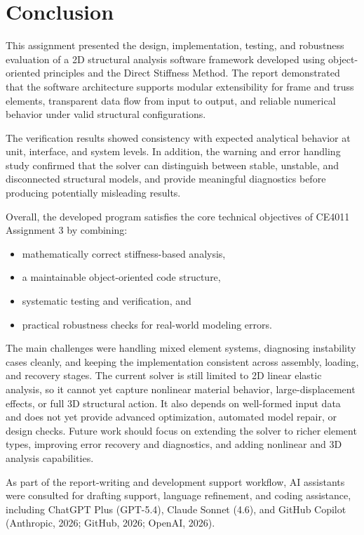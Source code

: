 \chapter{Conclusion}

This assignment presented the design, implementation, testing, and robustness evaluation of a 2D structural analysis software framework developed using object-oriented principles and the Direct Stiffness Method. The report demonstrated that the software architecture supports modular extensibility for frame and truss elements, transparent data flow from input to output, and reliable numerical behavior under valid structural configurations.

The verification results showed consistency with expected analytical behavior at unit, interface, and system levels. In addition, the warning and error handling study confirmed that the solver can distinguish between stable, unstable, and disconnected structural models, and provide meaningful diagnostics before producing potentially misleading results.

Overall, the developed program satisfies the core technical objectives of CE4011 Assignment 3 by combining:
\begin{itemize}
    \item mathematically correct stiffness-based analysis,
    \item a maintainable object-oriented code structure,
    \item systematic testing and verification, and
    \item practical robustness checks for real-world modeling errors.
\end{itemize}

The main challenges were handling mixed element systems, diagnosing instability cases cleanly, and keeping the implementation consistent across assembly, loading, and recovery stages. The current solver is still limited to 2D linear elastic analysis, so it cannot yet capture nonlinear material behavior, large-displacement effects, or full 3D structural action. It also depends on well-formed input data and does not yet provide advanced optimization, automated model repair, or design checks. Future work should focus on extending the solver to richer element types, improving error recovery and diagnostics, and adding nonlinear and 3D analysis capabilities.

As part of the report-writing and development support workflow, AI assistants were consulted for drafting support, language refinement, and coding assistance, including ChatGPT Plus (GPT-5.4), Claude Sonnet (4.6), and GitHub Copilot (Anthropic, 2026; GitHub, 2026; OpenAI, 2026).
